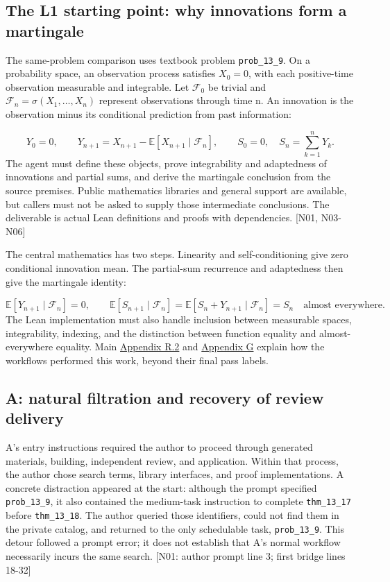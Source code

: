 \subsection[The L1 starting point: why innovations form a martingale]{\texorpdfstring{\protect\hypertarget{g5}{}The L1 starting point: why innovations form a martingale}{The L1 starting point: why innovations form a martingale}}
The same-problem comparison uses textbook problem \nolinkurl{prob_13_9}. On a probability space, an observation process satisfies $X_0=0$, with each positive-time observation measurable and integrable. Let $\mathcal F_0$ be trivial and $\mathcal F_n=\sigma(X_1,\ldots,X_n)$ represent observations through time n. An innovation is the observation minus its conditional prediction from past information:

\[
Y_0=0,\qquad Y_{n+1}=X_{n+1}-\mathbb E[X_{n+1}\mid\mathcal F_n],
\qquad S_0=0,\quad S_n=\sum_{k=1}^{n}Y_k.
\]
The agent must define these objects, prove integrability and adaptedness of innovations and partial sums, and derive the martingale conclusion from the source premises. Public mathematics libraries and general support are available, but callers must not be asked to supply those intermediate conclusions. The deliverable is actual Lean definitions and proofs with dependencies. [N01, N03-N06]

The central mathematics has two steps. Linearity and self-conditioning give zero conditional innovation mean. The partial-sum recurrence and adaptedness then give the martingale identity:

\[
\mathbb E[Y_{n+1}\mid\mathcal F_n]=0,
\qquad \mathbb E[S_{n+1}\mid\mathcal F_n]
=\mathbb E[S_n+Y_{n+1}\mid\mathcal F_n]=S_n
\quad\text{almost everywhere}.
\]
The Lean implementation must also handle inclusion between measurable spaces, integrability, indexing, and the distinction between function equality and almost-everywhere equality. Main \hyperlink{r2}{Appendix R.2} and \hyperlink{appendix-g}{Appendix G} explain how the workflows performed this work, beyond their final pass labels.

\subsection[A: natural filtration and recovery of review delivery]{\texorpdfstring{\protect\hypertarget{g6}{}A: natural filtration and recovery of review delivery}{A: natural filtration and recovery of review delivery}}
A's entry instructions required the author to proceed through generated materials, building, independent review, and application. Within that process, the author chose search terms, library interfaces, and proof implementations. A concrete distraction appeared at the start: although the prompt specified \nolinkurl{prob_13_9}, it also contained the medium-task instruction to complete \nolinkurl{thm_13_17} before \nolinkurl{thm_13_18}. The author queried those identifiers, could not find them in the private catalog, and returned to the only schedulable task, \nolinkurl{prob_13_9}. This detour followed a prompt error; it does not establish that A's normal workflow necessarily incurs the same search. [N01: author prompt line 3; first bridge lines 18-32]


